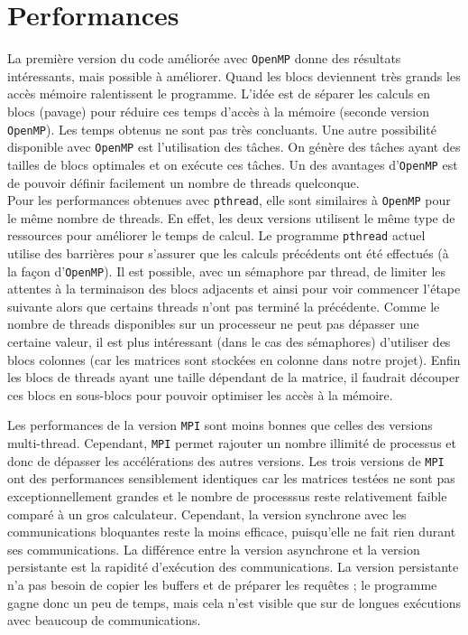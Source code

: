 \section{Performances} %
\label{sec:perf}

La première version du code améliorée avec \texttt{OpenMP} donne des résultats intéressants, mais possible à améliorer. Quand les blocs deviennent très grands les accès mémoire ralentissent le programme. L'idée est de séparer les calculs en blocs (pavage) pour réduire ces temps d'accès à la mémoire (seconde version \texttt{OpenMP}). Les temps obtenus ne sont pas très concluants. Une autre possibilité disponible avec \texttt{OpenMP} est l'utilisation des tâches. On génère des tâches ayant des tailles de blocs optimales et on exécute ces tâches. Un des avantages d'\texttt{OpenMP} est de pouvoir définir facilement un nombre de threads quelconque.\\

Pour les performances obtenues avec \texttt{pthread}, elle sont similaires à \texttt{OpenMP} pour le même nombre de threads. En effet, les deux versions utilisent le même type de ressources pour améliorer le temps de calcul. Le programme \texttt{pthread} actuel utilise des barrières pour s'assurer que les calculs précédents ont été effectués (à la façon d'\texttt{OpenMP}). Il est possible, avec un sémaphore par thread, de limiter les attentes à la terminaison des blocs adjacents et ainsi pour voir commencer l'étape suivante alors que certains threads n'ont pas terminé la précédente. Comme le nombre de threads disponibles sur un processeur ne peut pas dépasser une certaine valeur, il est plus intéressant (dans le cas des sémaphores) d'utiliser des blocs colonnes (car les matrices sont stockées en colonne dans notre projet). Enfin les blocs de threads ayant une taille dépendant de la matrice, il faudrait découper ces blocs en sous-blocs pour pouvoir optimiser les accès à la mémoire.

Les performances de la version \texttt{MPI} sont moins bonnes que celles des versions multi-thread. Cependant, \texttt{MPI} permet rajouter un nombre illimité de processus et donc de dépasser les accélérations des autres versions. Les trois versions de \texttt{MPI} ont des performances sensiblement identiques car les matrices testées ne sont pas exceptionnellement grandes et le nombre de processsus reste relativement faible comparé à un gros calculateur. Cependant, la version synchrone avec les communications bloquantes reste la moins efficace, puisqu'elle ne fait rien durant ses communications. La différence entre la version asynchrone et la version persistante est la rapidité d'exécution des communications. La version persistante n'a pas besoin de copier les buffers et de préparer les requêtes ; le programme gagne donc un peu de temps, mais cela n'est visible que sur de longues exécutions avec beaucoup de communications.

